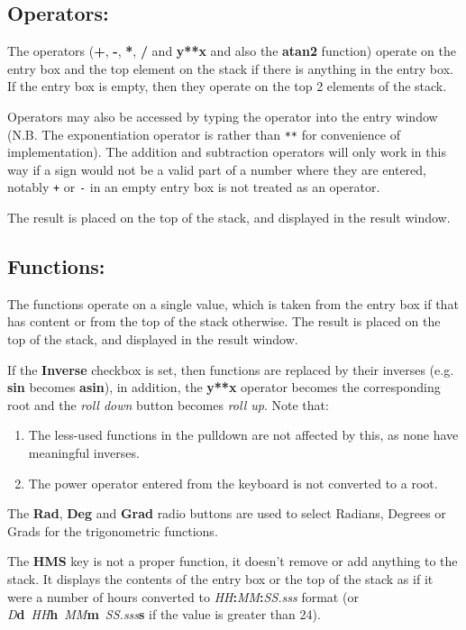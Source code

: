 \documentclass{article}
\begin{document}
  \subsection{Operators:}

  The operators (\textbf{+}, \textbf{-}, \textbf{*}, \textbf{/} and
  \textbf{y**x} and also the \textbf{atan2} function) operate on the entry
  box and the top element on the stack if there is anything in the
  entry box. If the entry box is empty, then they operate on the top 2
  elements of the stack.

  Operators may also be accessed by typing the operator into the entry
  window (N.B. The exponentiation operator is \texttt{\Circum} rather than
  \texttt{**} for convenience of implementation). The addition and
  subtraction operators will only work in this way if a sign would not
  be a valid part of a number where they are entered, notably
  \texttt{+} or \texttt{-} in an empty entry box is not treated as an
  operator.

  The result is placed on the top of the stack, and displayed in the
  result window.

  \subsection{Functions:}

  The functions operate on a single value, which is taken from the
  entry box if that has content or from the top of the stack
  otherwise. The result is placed on the top of the stack, and
  displayed in the result window.

  If the \textbf{Inverse} checkbox is set, then functions are replaced
  by their inverses (e.g. \textbf{sin} becomes \textbf{asin}), in
  addition, the \textbf{y**x} operator becomes the
  corresponding root and the
  \emph{roll down} button becomes \emph{roll up}. Note that:
  \begin{enumerate}
  \item The less-used functions in the pulldown are not affected by
    this, as none have meaningful inverses.
  \item The power operator \textbf{\Circum} entered from the keyboard is not
    converted to a root.
  \end{enumerate}

  The \textbf{Rad}, \textbf{Deg} and \textbf{Grad} radio buttons are
  used to select Radians, Degrees or Grads for the trigonometric
  functions.

  The \textbf{HMS} key is not a proper function, it doesn't remove or
  add anything to the stack. It displays the contents of the entry box
  or the top of the stack as if it were a number of hours converted to
  \emph{HH}\textbf{:}\emph{MM}\textbf{:}\emph{SS.sss} format (or
  \emph{D}\textbf{d}~\emph{HH}\textbf{h}~\emph{MM}\textbf{m}~\emph{SS.sss}\textbf{s}
  if the value is greater than 24).
\end{document}

